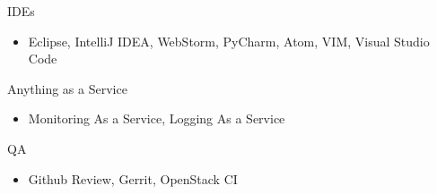 \begin{cvskills}
    \cvskill
    {IDEs}
    {
      \begin{itemize}[label={}]
        \item Eclipse, IntelliJ IDEA, WebStorm, PyCharm, Atom, VIM, Visual Studio Code
      \end{itemize}
    }

    \cvskill
    {Anything as a Service}
    {
      \begin{itemize}[label={}]
        \item Monitoring As a Service, Logging As a Service
      \end{itemize}
    }

    \cvskill
    {QA}
    {
      \begin{itemize}[label={}]
        \item Github Review, Gerrit, OpenStack CI
      \end{itemize}
    }

\end{cvskills}
